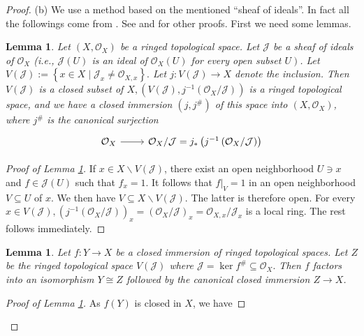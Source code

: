 \documentclass{amsart}
\newtheorem{lm}[theorem]{Lemma}
\theoremstyle{remark}\newtheorem{rmk}[theorem]{Remark}
\begin{document}
\begin{proof}
	(b) We use a method based on the mentioned ``sheaf of ideals''. In fact all the followings come from \cite[Ch. 2, Prop. 3.20, P. 47]{LIU}. See \cite[Ch. 3, Th. 3.42, P. 84]{GW} and \cite[P. 32]{BAG} for other proofs. First we need some lemmas.
	\begin{lm}
		\label{l13}
		Let $\left(X, \mathcal{O}_{X}\right)$ be a ringed topological space. Let $\mathcal{J}$ be a sheaf of ideals of $\mathcal{O}_{X}$ (i.e., $\mathcal{J}(U)$ is an ideal of $\mathcal{O}_{X}(U)$ for every open subset $\left.U\right)$. Let $V(\mathcal{J}):=\left\{x \in X \mid \mathcal{J}_{x} \neq \mathcal{O}_{X, x}\right\} .$ Let $j: V(\mathcal{J}) \rightarrow X$ denote the inclusion. Then $V(\mathcal{J})$ is a closed subset of $X,\left(V(\mathcal{J}), j^{-1}\left(\mathcal{O}_{X} / \mathcal{J}\right)\right)$ is a ringed topological space, and we have a closed immersion $\left(j, j^{\#}\right)$ of this space into $\left(X, \mathcal{O}_{X}\right)$, where $j^{\#}$ is the canonical surjection
		\begin{equation*}
			\begin{tikzcd}
				\mathcal{O}_{X} \arrow[r] & \mathcal{O}_{X} / \mathcal{J}=j_{*}\left(j^{-1}\left(\mathcal{O}_{X} / \mathcal{J}\right)\right)
			\end{tikzcd}
		\end{equation*}
	\end{lm}
	\begin{proof}[Proof of Lemma \ref*{l13}]
		If $x \in X \backslash V(\mathcal{J})$, there exist an open neighborhood $U \ni x$ and $f \in \mathcal{J}(U)$ such that $f_{x}=1$. It follows that $\left.f\right|_{V}=1$ in an open neighborhood $V \subseteq U$ of $x$. We then have $V \subseteq X \backslash V(\mathcal{J})$. The latter is therefore open. For every $x \in V(\mathcal{J}),\left(j^{-1}\left(\mathcal{O}_{X} / \mathcal{J}\right)\right)_{x}=\left(\mathcal{O}_{X} / \mathcal{J}\right)_{x}=\mathcal{O}_{X, x} / \mathcal{J}_{x}$ is a local ring.
		The rest follows immediately.
	\end{proof}
	\begin{lm}
		\label{l14}
		Let $f: Y \rightarrow X$ be a closed immersion of ringed topological spaces. Let $Z$ be the ringed topological space $V(\mathcal{J})$ where $\mathcal{J}=\ker f^{\#} \subseteq \mathcal{O}_{X} .$ Then $f$ factors into an isomorphism $Y \cong Z$ followed by the canonical closed immersion $Z \rightarrow X$.
	\end{lm}
	\begin{proof}[Proof of Lemma \ref*{l14}]
		As $f(Y)$ is closed in $X$, we have

\end{proof}
\end{proof}
\end{document}
